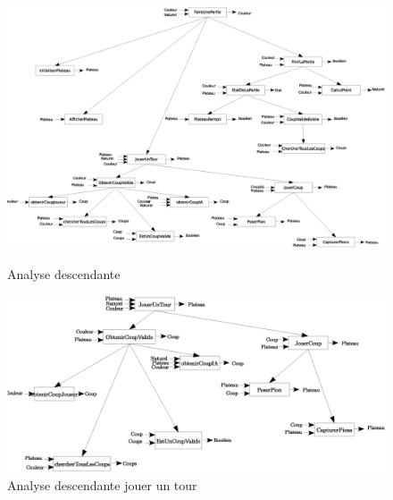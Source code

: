 \begin{figure}[h]
  \centering
  \includegraphics[scale = 0.2]{./Rapport/Analyse_descendante.eps}
  \caption{Analyse descendante}
  \includegraphics[scale = 0.2]{./Rapport/Analyse_descendante_jouer_un_tour.eps}
  \caption{Analyse descendante jouer un tour}
\end{figure}